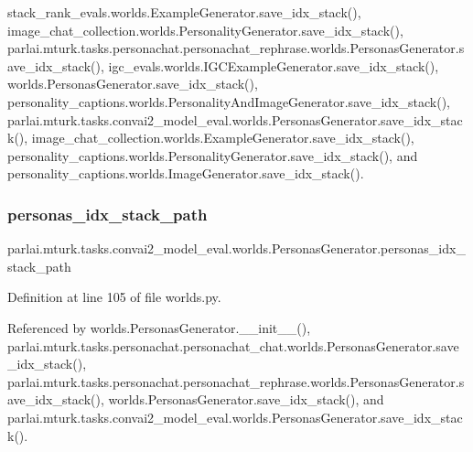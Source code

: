 stack\+\_\+rank\+\_\+evals.\+worlds.\+Example\+Generator.\+save\+\_\+idx\+\_\+stack(), image\+\_\+chat\+\_\+collection.\+worlds.\+Personality\+Generator.\+save\+\_\+idx\+\_\+stack(), parlai.\+mturk.\+tasks.\+personachat.\+personachat\+\_\+rephrase.\+worlds.\+Personas\+Generator.\+save\+\_\+idx\+\_\+stack(), igc\+\_\+evals.\+worlds.\+I\+G\+C\+Example\+Generator.\+save\+\_\+idx\+\_\+stack(), worlds.\+Personas\+Generator.\+save\+\_\+idx\+\_\+stack(), personality\+\_\+captions.\+worlds.\+Personality\+And\+Image\+Generator.\+save\+\_\+idx\+\_\+stack(), parlai.\+mturk.\+tasks.\+convai2\+\_\+model\+\_\+eval.\+worlds.\+Personas\+Generator.\+save\+\_\+idx\+\_\+stack(), image\+\_\+chat\+\_\+collection.\+worlds.\+Example\+Generator.\+save\+\_\+idx\+\_\+stack(), personality\+\_\+captions.\+worlds.\+Personality\+Generator.\+save\+\_\+idx\+\_\+stack(), and personality\+\_\+captions.\+worlds.\+Image\+Generator.\+save\+\_\+idx\+\_\+stack().

\mbox{\label{classparlai_1_1mturk_1_1tasks_1_1convai2__model__eval_1_1worlds_1_1PersonasGenerator_a4d234fa06082edf35bb1554c1d52455b}} 
\subsubsection{\texorpdfstring{personas\+\_\+idx\+\_\+stack\+\_\+path}{personas\_idx\_stack\_path}}
{\footnotesize\ttfamily parlai.\+mturk.\+tasks.\+convai2\+\_\+model\+\_\+eval.\+worlds.\+Personas\+Generator.\+personas\+\_\+idx\+\_\+stack\+\_\+path}



Definition at line 105 of file worlds.\+py.



Referenced by worlds.\+Personas\+Generator.\+\_\+\+\_\+init\+\_\+\+\_\+(), parlai.\+mturk.\+tasks.\+personachat.\+personachat\+\_\+chat.\+worlds.\+Personas\+Generator.\+save\+\_\+idx\+\_\+stack(), parlai.\+mturk.\+tasks.\+personachat.\+personachat\+\_\+rephrase.\+worlds.\+Personas\+Generator.\+save\+\_\+idx\+\_\+stack(), worlds.\+Personas\+Generator.\+save\+\_\+idx\+\_\+stack(), and parlai.\+mturk.\+tasks.\+convai2\+\_\+model\+\_\+eval.\+worlds.\+Personas\+Generator.\+save\+\_\+idx\+\_\+stack().

